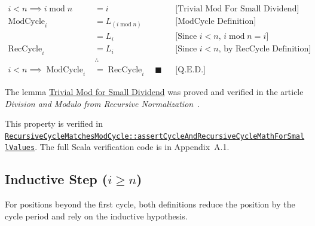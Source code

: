 \begin{equation*}
\begin{aligned}
i<n \implies i\operatorname{mod}n &= i
  && \text{[Trivial Mod For Small Dividend]} \\
\operatorname{ModCycle}_i &= L_{(i\operatorname{mod}n)}
  && \text{[ModCycle Definition]} \\
&=L_i && \text{[Since }i<n\text{, }i\operatorname{mod}n=i\text{]} \\
\operatorname{RecCycle}_i &= L_i
  && \text{[Since }i<n\text{, by RecCycle Definition]} \\
&\therefore \\
i<n \implies \operatorname{ModCycle}_i &= \operatorname{RecCycle}_i
  \quad \blacksquare && \text{[Q.E.D.]}
\end{aligned}
\end{equation*}

The lemma
\href{https://github.com/thiagomata/prime-numbers/blob/cycle-article-v1.0.0/articles/chapter2/modulo.md#61-trivial-case}{Trivial Mod for Small Dividend}
was proved and verified in the article
\emph{Division and Modulo from Recursive Normalization}~\cite{mata2026modulo}.

{\raggedright
This property is verified in
\href{https://github.com/thiagomata/prime-numbers/blob/cycle-article-v1.0.0/src/main/scala/v1/chapter4/cycle/recursive/properties/RecursiveCycleMatchesModCycle.scala}{\texttt{RecursiveCycleMatchesModCycle::}\allowbreak\texttt{assertCycleAndRecursiveCycleMathForSmallValues}}.
The full Scala verification code is in Appendix~A.1.
\par}

\subsection{Inductive Step (\texorpdfstring{$i\geq n$}{i >= n})}

For positions beyond the first cycle, both definitions reduce the position by
the cycle period and rely on the inductive hypothesis.

